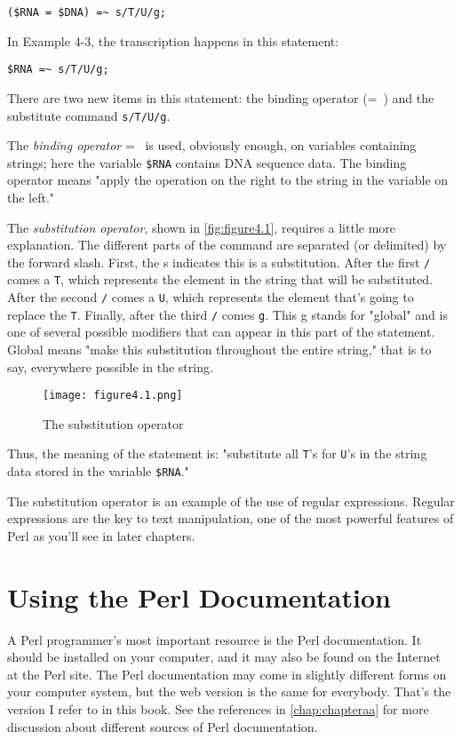 \begin{lstlisting}
($RNA = $DNA) =~ s/T/U/g;
\end{lstlisting}

In Example 4-3, the transcription happens in this statement:

\begin{lstlisting}
$RNA =~ s/T/U/g;
\end{lstlisting}

There are two new items in this statement: the binding operator (=~) and the substitute command \verb|s/T/U/g|.

The \textit{binding operator} =~ is used, obviously enough, on variables
containing strings; here the variable \verb|$RNA| contains DNA sequence data. The binding operator means "apply the operation on the right to the string in the variable on the left."

The \textit{substitution operator}, shown in \autoref{fig:figure4.1}, requires a little more explanation. The different parts of the command are separated (or delimited) by the forward slash. First, the s indicates this is a substitution. After the first \verb|/| comes a \verb|T|, which represents the element in the string that will be substituted. After the second \verb|/| comes a \verb|U|, which represents the element that's going to replace the \verb|T|. Finally, after the third \verb|/| comes \verb|g|. This g stands for "global" and is one of several possible modifiers that can appear in this part of the statement. Global means "make this substitution throughout the entire string," that is to say, everywhere possible in the string. 

\begin{figure}
  \centering
  \texttt{[image: figure4.1.png]}
  \caption{The substitution operator}
  \label{fig:figure4.1}
\end{figure}

Thus, the meaning of the statement is: "substitute all \verb|T|'s for \verb|U|'s in the string data stored in the variable \verb|$RNA|."

The substitution operator is an example of the use of regular expressions. Regular expressions are the key to text manipulation, one of the most powerful features of Perl as you'll see in later chapters. 

\section{Using the Perl Documentation}
A Perl programmer's most important resource is the Perl documentation.  It should be installed on your computer, and it may also be found on the Internet at the Perl site. The Perl documentation may come in slightly different forms on your computer system, but the web version is the same for everybody. That's the version I refer to in this book. See the references in \autoref{chap:chapteraa} for more discussion about different sources of Perl documentation.

